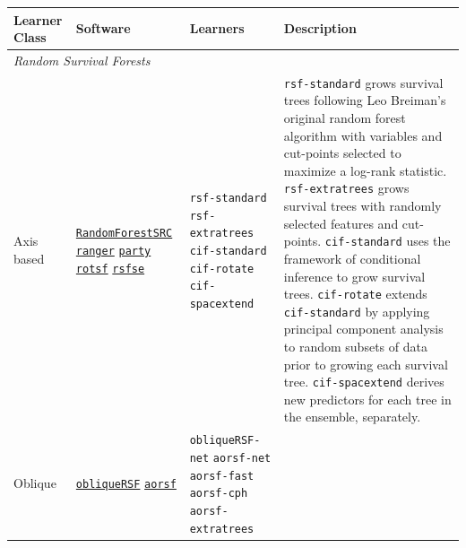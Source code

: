 \documentclass[twoside,11pt]{article}\usepackage[]{graphicx}\usepackage[]{xcolor}
\begin{document}
\begin{landscape}

\begin{table}[h!]
\centering
\begin{tabular}{p{2cm} | p{3cm} p{4cm} p{12cm}}
 \hline
 Learner Class & Software & Learners & Description \\ [0.5ex]
 \hline\hline
 \multicolumn{3}{l}{\textit{Random Survival Forests}}\\
 \hline\hline

 Axis based &

 \href{https://www.randomforestsrc.org/index.html}{\texttt{RandomForestSRC}} \newline
 \href{https://CRAN.R-project.org/package=ranger}{\texttt{ranger}} \newline
 \href{http://party.r-forge.r-project.org/}{\texttt{party}} \newline
 \href{https://github.com/whcsu/rotsf}{\texttt{rotsf}} \newline
 \href{https://github.com/whcsu/rsfse}{\texttt{rsfse}} &

 \texttt{rsf-standard} \newline
 \texttt{rsf-extratrees} \newline
 \texttt{cif-standard} \newline
 \texttt{cif-rotate} \newline
 \texttt{cif-spacextend} &

 \texttt{rsf-standard} grows survival trees following Leo Breiman's original random forest algorithm with variables and cut-points selected to maximize a log-rank statistic. \texttt{rsf-extratrees} grows survival trees with randomly selected features and cut-points. \texttt{cif-standard} uses the framework of conditional inference to grow survival trees. \texttt{cif-rotate} extends \texttt{cif-standard} by applying principal component analysis to random subsets of data prior to growing each survival tree. \texttt{cif-spacextend} derives new predictors for each tree in the ensemble, separately. \\ \hline


 Oblique &


 \href{https://CRAN.R-project.org/package=obliqueRSF}{\texttt{obliqueRSF}} \newline
 \href{https://bcjaeger.github.io/aorsf/}{\texttt{aorsf}} &

 \texttt{obliqueRSF-net} \newline
 \texttt{aorsf-net} \newline
 \texttt{aorsf-fast} \newline
 \texttt{aorsf-cph} \newline
 \texttt{aorsf-extratrees} &



\end{tabular}
\end{table}
\end{landscape}
\end{document}
